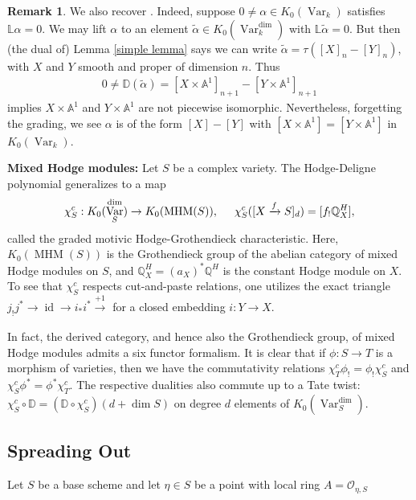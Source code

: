 \documentclass{amsart}
\theoremstyle{definition}
\newtheorem{rmk}[thm]{Remark}
\DeclareMathOperator{\Var}{Var}
\DeclareMathOperator{\MHM}{MHM}
\DeclareMathOperator{\id}{id}
\newcommand{\K}{K_0(\Var_k)}
\newcommand{\Kdim}{K_0(\Var_k^{\dim})}
\newcommand{\KdimS}{K_0(\Var_S^{\dim})}
\numberwithin{equation}{section}
\begin{document}
\begin{rmk}
We also recover \cite[Theorems $C$ and $D$]{zakharevich}. Indeed, suppose $0 \neq \alpha \in K_0(\Var_k)$ satisfies $\mathbb{L} \alpha = 0$. We may lift $\alpha$ to an element $\tilde{\alpha} \in \Kdim$ with $\mathbb{L} \tilde{\alpha} = 0$. But then (the dual of) Lemma \ref{simple lemma} says we can write $\tilde{\alpha} = \tau ( [X]_n - [Y]_n )$, with $X$ and $Y$ smooth and proper of dimension $n$. Thus
\begin{align*}
    0 \neq \mathbb{D}(\tilde{\alpha}) = [X \times \mathbb{A}^1]_{n+1} - [Y \times \mathbb{A}^1]_{n+1}
\end{align*}
implies $X \times \mathbb{A}^1$ and $Y \times \mathbb{A}^1$ are not piecewise isomorphic. Nevertheless, forgetting the grading, we see $\alpha$ is of the form $[X] - [Y]$ with $[X \times \mathbb{A}^1] = [Y \times \mathbb{A}^1]$ in $\K$.
\end{rmk}




\textbf{Mixed Hodge modules:}\label{mhm subsection} Let $S$ be a complex variety. The Hodge-Deligne polynomial generalizes to a map
\begin{align*}
    \chi_{S}^c: \KdimS \rightarrow K_0(\MHM(S)), \hspace{.5cm} \chi^c_{S}([X \xrightarrow[]{f} S]_d) = [f_! \mathbb{Q}_X^{H}],
\end{align*}
called the graded motivic Hodge-Grothendieck characteristic. Here, $K_0(\MHM(S))$ is the Grothendieck group of the abelian category of mixed Hodge modules on $S$, and $\mathbb{Q}_X^{H} = (a_X)^*\mathbb{Q}^H$ is the constant Hodge module on $X$. To see that $\chi_S^c$ respects cut-and-paste relations, one utilizes the exact triangle $j_!j^* \rightarrow \id \rightarrow i_* i^* \xrightarrow[]{+1}$ for a closed embedding $i:Y \rightarrow X$.

In fact, the derived category, and hence also the Grothendieck group, of mixed Hodge modules admits a six functor formalism. It is clear that if $\phi:S \rightarrow T$ is a morphism of varieties, then we have the commutativity relations $\chi^c_{T} \phi_! = \phi_! \chi^c_S$ and $\chi^c_S \phi^* = \phi^* \chi^c_T$. The respective dualities also commute up to a Tate twist: $\chi_S^c \circ \mathbb{D} = (\mathbb{D} \circ \chi^c_S)(d+\dim S)$ on degree $d$ elements of $\KdimS$. 



\subsection{Spreading Out}
Let $S$ be a base scheme and let $\eta \in S$ be a point with local ring $A = \mathscr{O}_{\eta, S}$
\end{document}
